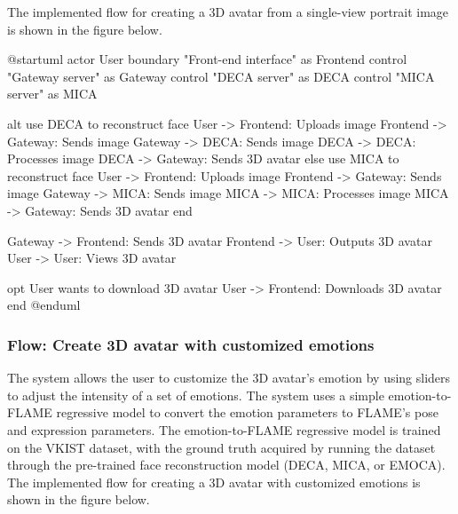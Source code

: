 The implemented flow for creating a 3D avatar from a single-view portrait image is shown in the figure below.

\begin{umlfigure}
    @startuml
    actor User
    boundary "Front-end interface" as Frontend
    control "Gateway server" as Gateway
    control "DECA server" as DECA
    control "MICA server" as MICA


    alt use DECA to reconstruct face
    User -> Frontend: Uploads image
    Frontend -> Gateway: Sends image
    Gateway -> DECA: Sends image
    DECA -> DECA: Processes image
    DECA -> Gateway: Sends 3D avatar
    else use MICA to reconstruct face
    User -> Frontend: Uploads image
    Frontend -> Gateway: Sends image
    Gateway -> MICA: Sends image
    MICA -> MICA: Processes image
    MICA -> Gateway: Sends 3D avatar
    end

    Gateway -> Frontend: Sends 3D avatar
    Frontend -> User: Outputs 3D avatar
    User -> User: Views 3D avatar

    opt User wants to download 3D avatar
    User -> Frontend: Downloads 3D avatar
    end
    @enduml
\end{umlfigure}


\subsubsection{Flow: Create 3D avatar with customized emotions}
The system allows the user to customize the 3D avatar's emotion by using sliders to adjust the intensity of a set of emotions. The system uses a simple emotion-to-FLAME regressive model to convert the emotion parameters to FLAME's pose and expression parameters. The emotion-to-FLAME regressive model is trained on the VKIST dataset, with the ground truth acquired by running the dataset through the pre-trained face reconstruction model (DECA, MICA, or EMOCA). The implemented flow for creating a 3D avatar with customized emotions is shown in the figure below.

\clearpage


